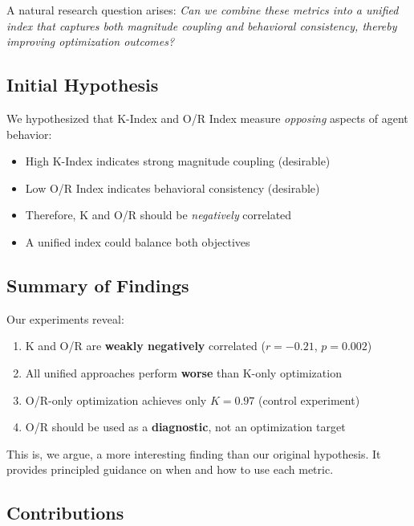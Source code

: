 \documentclass[twoside]{article}
\theoremstyle{remark}
\begin{document}
A natural research question arises: \emph{Can we combine these metrics into a
unified index that captures both magnitude coupling and behavioral consistency,
thereby improving optimization outcomes?}

\subsection{Initial Hypothesis}

We hypothesized that K-Index and O/R Index measure \emph{opposing} aspects of
agent behavior:
\begin{itemize}
    \item High K-Index indicates strong magnitude coupling (desirable)
    \item Low O/R Index indicates behavioral consistency (desirable)
    \item Therefore, K and O/R should be \emph{negatively} correlated
    \item A unified index could balance both objectives
\end{itemize}

\subsection{Summary of Findings}

Our experiments reveal:

\begin{enumerate}
    \item K and O/R are \textbf{weakly negatively} correlated ($r = -0.21$, $p = 0.002$)
    \item All unified approaches perform \textbf{worse} than K-only optimization
    \item O/R-only optimization achieves only $K = 0.97$ (control experiment)
    \item O/R should be used as a \textbf{diagnostic}, not an optimization target
\end{enumerate}

This is, we argue, a more interesting finding than our original hypothesis. It
provides principled guidance on when and how to use each metric.

\subsection{Contributions}
\end{document}
